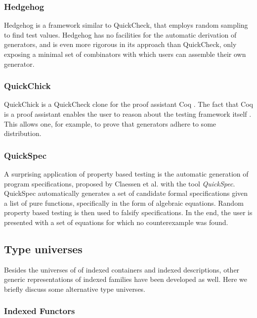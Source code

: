 \documentclass[a4paper,msc,twosized=semi]{uustthesis}
\begin{document}
\subsubsection{Hedgehog}

  Hedgehog \cite{hedgehog} is a framework similar to QuickCheck, that employs random sampling 
  to find test values. Hedgehog has no facilities for the automatic derivation of generators, 
  and is even more rigorous in its approach than QuickCheck, only exposing a minimal set 
  of combinators with which users can assemble their own generator. 

\subsubsection{QuickChick} 

  QuickChick is a QuickCheck clone for the proof assistant Coq \cite
  {denes2014quickchick}. The fact that Coq is a proof assistant enables the user to 
  reason about the testing framework itself \cite{paraskevopoulou2015foundational}. 
  This allows one, for example, to prove that generators adhere to some distribution. 

\subsubsection{QuickSpec}

  A surprising application of property based testing is the automatic generation of 
  program specifications, proposed by Claessen et al. \cite{claessen2010quickspec} 
  with the tool \textit{QuickSpec}. QuickSpec automatically generates a set of 
  candidate formal specifications given a list of pure functions, specifically in the 
  form of algebraic equations. Random property based testing is then used to falsify 
  specifications. In the end, the user is presented with a set of equations for which 
  no counterexample was found.  

\subsection{Type universes}

  Besides the universes of of indexed containers and indexed descriptions, other generic 
  representations of indexed families have been developed as well. Here we briefly discuss 
  some alternative type universes. 

\subsubsection{Indexed Functors}
\end{document}
